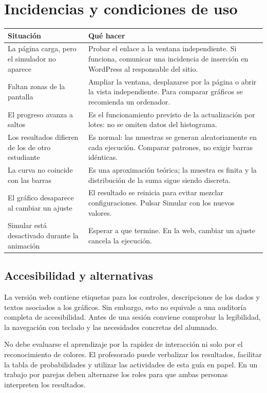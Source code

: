 \documentclass[11pt,a4paper]{article}
\begin{document}
\clearpage\section{Incidencias y condiciones de uso}
\begin{tabularx}{\textwidth}{@{}p{43mm}Y@{}}\toprule
\textbf{Situación} & \textbf{Qué hacer}\\\midrule
La página carga, pero el simulador no aparece & Probar el enlace a la ventana independiente. Si funciona, comunicar una incidencia de inserción en WordPress al responsable del sitio.\\
Faltan zonas de la pantalla & Ampliar la ventana, desplazarse por la página o abrir la vista independiente. Para comparar gráficos se recomienda un ordenador.\\
El progreso avanza a saltos & Es el funcionamiento previsto de la actualización por lotes: no se omiten datos del histograma.\\
Los resultados difieren de los de otro estudiante & Es normal: las muestras se generan aleatoriamente en cada ejecución. Comparar patrones, no exigir barras idénticas.\\
La curva no coincide con las barras & Es una aproximación teórica; la muestra es finita y la distribución de la suma sigue siendo discreta.\\
El gráfico desaparece al cambiar un ajuste & El resultado se reinicia para evitar mezclar configuraciones. Pulsar Simular con los nuevos valores.\\
Simular está desactivado durante la animación & Esperar a que termine. En la web, cambiar un ajuste cancela la ejecución.\\\bottomrule
\end{tabularx}

\subsection{Accesibilidad y alternativas}
La versión web contiene etiquetas para los controles, descripciones de los dados y textos asociados a los gráficos. Sin embargo, esto no equivale a una auditoría completa de accesibilidad. Antes de una sesión conviene comprobar la legibilidad, la navegación con teclado y las necesidades concretas del alumnado.

No debe evaluarse el aprendizaje por la rapidez de interacción ni solo por el reconocimiento de colores. El profesorado puede verbalizar los resultados, facilitar la tabla de probabilidades y utilizar las actividades de esta guía en papel. En un trabajo por parejas deben alternarse los roles para que ambas personas interpreten los resultados.
\end{document}
